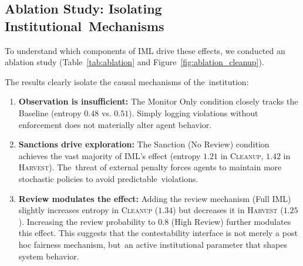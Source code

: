 \documentclass[mca,article,accept,pdftex,oneauthor]{Definitions/mdpi}
\begin{document}
\subsection{Ablation Study: Isolating Institutional~Mechanisms}

To understand which components of IML drive these effects, we conducted an ablation study (Table~\ref{tab:ablation} and Figure~\ref{fig:ablation_cleanup}). 

The results clearly isolate the causal mechanisms of the~institution:
\begin{enumerate}
    \item \textbf{Observation is insufficient:} The Monitor Only condition closely tracks the Baseline (entropy $0.48$ vs. $0.51$). Simply logging violations without enforcement does not materially alter agent behavior.
    \item \textbf{Sanctions drive exploration:} The Sanction (No Review) condition achieves the vast majority of IML's effect (entropy $1.21$ in \textsc{Cleanup}, $1.42$ in \textsc{Harvest}). The~threat of external penalty forces agents to maintain more stochastic policies to avoid \mbox{predictable violations.}
    \item \textbf{Review modulates the effect:} Adding the review mechanism (Full IML) slightly increases entropy in \textsc{Cleanup} ($1.34$) but decreases it in \textsc{Harvest} ($1.25$). Increasing the review probability to $0.8$ (High Review) further modulates this effect. This suggests that the contestability interface is not merely a post hoc fairness mechanism, but~an active institutional parameter that shapes system behavior.
\end{enumerate}
\vspace{-6pt}
\end{document}
